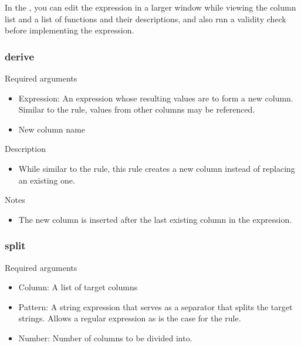 \documentclass[letterpaper,10pt,english]{sphinxmanual}
\begin{document}
In the , you can edit the expression in a larger window while viewing the column list and a list of functions and their descriptions, and also run a validity check before implementing the expression.


\subsubsection{derive}
\label{\detokenize{discovery/part07/rule_kinds:derive}}
Required arguments
\begin{itemize}
\item {} 
Expression: An expression whose resulting values are to form a new column. Similar to the {\hyperref[\detokenize{discovery/part07/rule_kinds:set}]{}} rule, values from other columns may be referenced.

\item {} 
New column name

\end{itemize}

Description
\begin{itemize}
\item {} 
While similar to the {\hyperref[\detokenize{discovery/part07/rule_kinds:set}]{}} rule, this rule creates a new column instead of replacing an existing one.

\end{itemize}

Notes
\begin{itemize}
\item {} 
The new column is inserted after the last existing column in the expression.

\end{itemize}


\subsubsection{split}
\label{\detokenize{discovery/part07/rule_kinds:split}}
Required arguments
\begin{itemize}
\item {} 
Column: A list of target columns

\item {} 
Pattern: A string expression that serves as a separator that splits the target strings. Allows a regular expression as is the case for the {\hyperref[\detokenize{discovery/part07/rule_kinds:replace}]{}} rule.

\item {} 
Number: Number of columns to be divided into.

\end{itemize}
\end{document}
